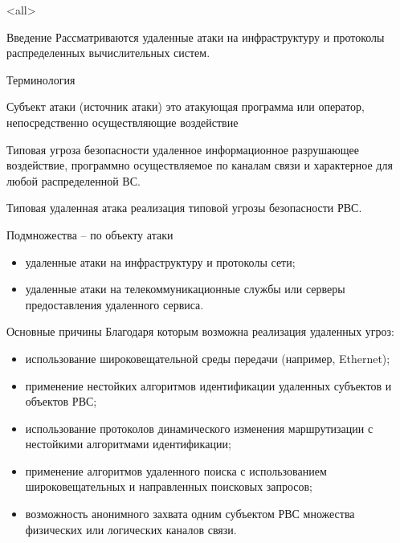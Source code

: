 

\subtitle{Обзор и классификация\\сетевых угроз безопасности}



\mode<all>{}

%
%

\begin{frame}{Введение}
Рассматриваются удаленные атаки на инфраструктуру и протоколы распределенных вычислительных систем.
\end{frame}


\begin{frame}{Терминология}
	\begin{block}{Субъект атаки (источник атаки)}
		это атакующая программа или оператор,  непосредственно осуществляющие воздействие
	\end{block}
	\begin{block}{Типовая угроза безопасности}
		удаленное информационное разрушающее воздействие,  программно осуществляемое по каналам связи и характерное для любой распределенной ВС.
	\end{block}
	\begin{block}{Типовая удаленная атака}
		реализация типовой угрозы безопасности РВС.
	\end{block}
\end{frame}


\begin{frame}{Подмножества -- по объекту атаки}

	\begin{itemize}
		\item удаленные атаки на инфраструктуру и протоколы сети;
		\item удаленные атаки на телекоммуникационные службы или серверы предоставления удаленного сервиса.
	\end{itemize}
\end{frame}


\begin{frame}{Основные причины}
Благодаря которым возможна реализация удаленных угроз:
\begin{itemize}
	\item использование широковещательной среды передачи (например,  Ethernet); \pause
	\item применение нестойких алгоритмов идентификации удаленных субъектов и объектов РВС; \pause
	\item использование протоколов динамического изменения маршрутизации с нестойкими алгоритмами идентификации; \pause
	\item применение алгоритмов удаленного поиска с использованием широковещательных и направленных поисковых запросов; \pause
	\item возможность анонимного захвата одним субъектом РВС множества физических или логических каналов связи.
\end{itemize}
\end{frame}


